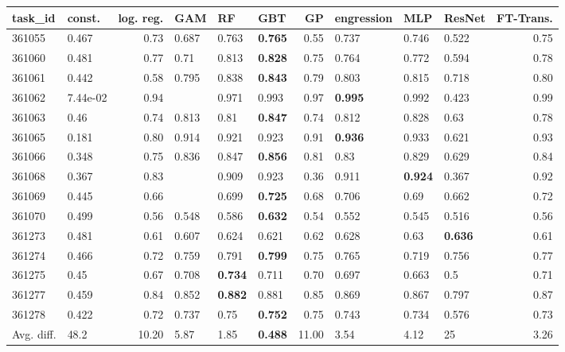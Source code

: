 \begin{table}[ht!]
\centering
\begingroup\footnotesize
\begin{tabular}{llrlllrlllr}
  \hline
\hline
task\_id & const. & log. reg. & GAM & RF & GBT & GP & engression & MLP & ResNet & FT-Trans. \\ 
  \hline
361055 & 0.467 & 0.73 & 0.687 & 0.763 & \textbf{0.765} & 0.55 & 0.737 & 0.746 & 0.522 & 0.75 \\ 
  361060 & 0.481 & 0.77 & 0.71 & 0.813 & \textbf{0.828} & 0.75 & 0.764 & 0.772 & 0.594 & 0.78 \\ 
  361061 & 0.442 & 0.58 & 0.795 & 0.838 & \textbf{0.843} & 0.79 & 0.803 & 0.815 & 0.718 & 0.80 \\ 
  361062 & 7.44e-02 & 0.94 &  & 0.971 & 0.993 & 0.97 & \textbf{0.995} & 0.992 & 0.423 & 0.99 \\ 
  361063 & 0.46 & 0.74 & 0.813 & 0.81 & \textbf{0.847} & 0.74 & 0.812 & 0.828 & 0.63 & 0.78 \\ 
  361065 & 0.181 & 0.80 & 0.914 & 0.921 & 0.923 & 0.91 & \textbf{0.936} & 0.933 & 0.621 & 0.93 \\ 
  361066 & 0.348 & 0.75 & 0.836 & 0.847 & \textbf{0.856} & 0.81 & 0.83 & 0.829 & 0.629 & 0.84 \\ 
  361068 & 0.367 & 0.83 &  & 0.909 & 0.923 & 0.36 & 0.911 & \textbf{0.924} & 0.367 & 0.92 \\ 
  361069 & 0.445 & 0.66 &  & 0.699 & \textbf{0.725} & 0.68 & 0.706 & 0.69 & 0.662 & 0.72 \\ 
  361070 & 0.499 & 0.56 & 0.548 & 0.586 & \textbf{0.632} & 0.54 & 0.552 & 0.545 & 0.516 & 0.56 \\ 
  361273 & 0.481 & 0.61 & 0.607 & 0.624 & 0.621 & 0.62 & 0.628 & 0.63 & \textbf{0.636} & 0.61 \\ 
  361274 & 0.466 & 0.72 & 0.759 & 0.791 & \textbf{0.799} & 0.75 & 0.765 & 0.719 & 0.756 & 0.77 \\ 
  361275 & 0.45 & 0.67 & 0.708 & \textbf{0.734} & 0.711 & 0.70 & 0.697 & 0.663 & 0.5 & 0.71 \\ 
  361277 & 0.459 & 0.84 & 0.852 & \textbf{0.882} & 0.881 & 0.85 & 0.869 & 0.867 & 0.797 & 0.87 \\ 
  361278 & 0.422 & 0.72 & 0.737 & 0.75 & \textbf{0.752} & 0.75 & 0.743 & 0.734 & 0.576 & 0.73 \\ 
   \hline
Avg. diff. & 48.2 & 10.20 & 5.87 & 1.85 & \textbf{0.488} & 11.00 & 3.54 & 4.12 & 25 & 3.26 \\ 

\end{tabular}
\end{table}
